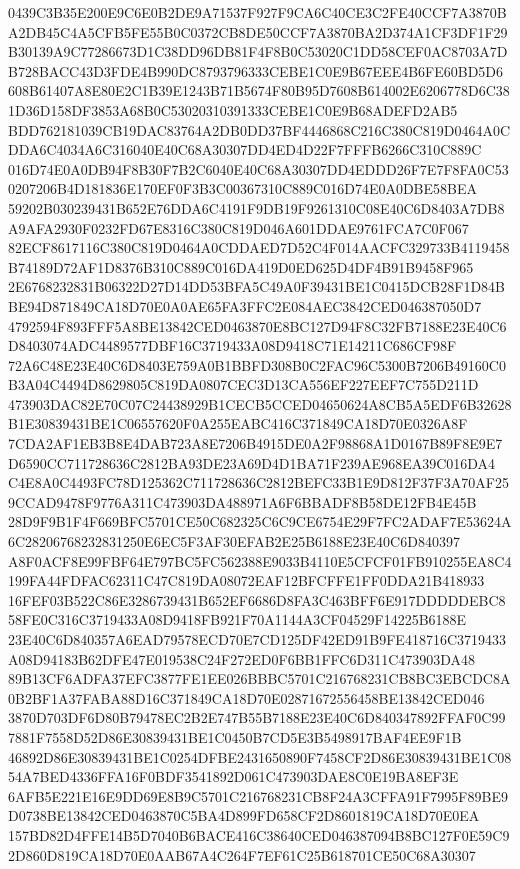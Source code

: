 \documentclass[UTF8,fontset=fandol,zihao=-4,a4paper]{ctexart}
\begin{document}
{{0439C3B35E200E9C6E0B2DE9A71537F927F9CA6C40CE3C2FE40CCF7A3870BA2DB45C4A5CFB5FE55B0C0372CB8DE50CCF7A3870BA2D374A1CF3DF1F29
B30139A9C77286673D1C38DD96DB81F4F8B0C53020C1DD58CEF0AC8703A7DB728BACC43D3FDE4B990DC8793796333CEBE1C0E9B67EEE4B6FE60BD5D6
608B61407A8E80E2C1B39E1243B71B5674F80B95D7608B614002E6206778D6C381D36D158DF3853A68B0C53020310391333CEBE1C0E9B68ADEFD2AB5
BDD762181039CB19DAC83764A2DB0DD37BF4446868C216C380C819D0464A0CDDA6C4034A6C316040E40C68A30307DD4ED4D22F7FFFB6266C310C889C
016D74E0A0DB94F8B30F7B2C6040E40C68A30307DD4EDDD26F7E7F8FA0C530207206B4D181836E170EF0F3B3C00367310C889C016D74E0A0DBE58BEA
59202B030239431B652E76DDA6C4191F9DB19F9261310C08E40C6D8403A7DB8A9AFA2930F0232FD67E8316C380C819D046A601DDAE9761FCA7C0F067
82ECF8617116C380C819D0464A0CDDAED7D52C4F014AACFC329733B4119458B74189D72AF1D8376B310C889C016DA419D0ED625D4DF4B91B9458F965
2E6768232831B06322D27D14DD53BFA5C49A0F39431BE1C0415DCB28F1D84BBE94D871849CA18D70E0A0AE65FA3FFC2E084AEC3842CED046387050D7
4792594F893FFF5A8BE13842CED0463870E8BC127D94F8C32FB7188E23E40C6D8403074ADC4489577DBF16C3719433A08D9418C71E14211C686CF98F
72A6C48E23E40C6D8403E759A0B1BBFD308B0C2FAC96C5300B7206B49160C0B3A04C4494D8629805C819DA0807CEC3D13CA556EF227EEF7C755D211D
473903DAC82E70C07C24438929B1CECB5CCED04650624A8CB5A5EDF6B32628B1E30839431BE1C06557620F0A255EABC416C371849CA18D70E0326A8F
7CDA2AF1EB3B8E4DAB723A8E7206B4915DE0A2F98868A1D0167B89F8E9E7D6590CC711728636C2812BA93DE23A69D4D1BA71F239AE968EA39C016DA4
C4E8A0C4493FC78D125362C711728636C2812BEFC33B1E9D812F37F3A70AF259CCAD9478F9776A311C473903DA488971A6F6BBADF8B58DE12FB4E45B
28D9F9B1F4F669BFC5701CE50C682325C6C9CE6754E29F7FC2ADAF7E53624A6C28206768232831250E6EC5F3AF30EFAB2E25B6188E23E40C6D840397
A8F0ACF8E99FBF64E797BC5FC562388E9033B4110E5CFCF01FB910255EA8C4199FA44FDFAC62311C47C819DA08072EAF12BFCFFE1FF0DDA21B418933
16FEF03B522C86E3286739431B652EF6686D8FA3C463BFF6E917DDDDDEBC858FE0C316C3719433A08D9418FB921F70A1144A3CF04529F14225B6188E
23E40C6D840357A6EAD79578ECD70E7CD125DF42ED91B9FE418716C3719433A08D94183B62DFE47E019538C24F272ED0F6BB1FFC6D311C473903DA48
89B13CF6ADFA37EFC3877FE1EE026BBBC5701C216768231CB8BC3EBCDC8A0B2BF1A37FABA88D16C371849CA18D70E02871672556458BE13842CED046
3870D703DF6D80B79478EC2B2E747B55B7188E23E40C6D840347892FFAF0C997881F7558D52D86E30839431BE1C0450B7CD5E3B5498917BAF4EE9F1B
46892D86E30839431BE1C0254DFBE2431650890F7458CF2D86E30839431BE1C0854A7BED4336FFA16F0BDF3541892D061C473903DAE8C0E19BA8EF3E
6AFB5E221E16E9DD69E8B9C5701C216768231CB8F24A3CFFA91F7995F89BE9D0738BE13842CED0463870C5BA4D899FD658CF2D8601819CA18D70E0EA
157BD82D4FFE14B5D7040B6BACE416C38640CED046387094B8BC127F0E59C92D860D819CA18D70E0AAB67A4C264F7EF61C25B618701CE50C68A30307
}}
\end{document}
